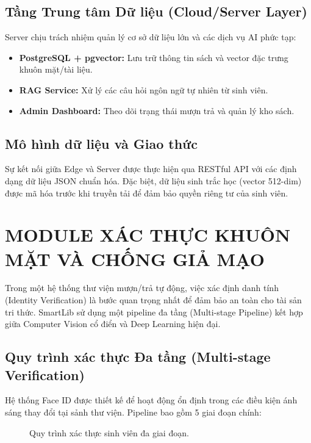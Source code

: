 \documentclass[12pt,a4paper]{article}
\begin{document}
\subsection{Tầng Trung tâm Dữ liệu (Cloud/Server Layer)}
Server chịu trách nhiệm quản lý cơ sở dữ liệu lớn và các dịch vụ AI phức tạp:
\begin{itemize}
    \item \textbf{PostgreSQL + pgvector:} Lưu trữ thông tin sách và vector đặc trưng khuôn mặt/tài liệu.
    \item \textbf{RAG Service:} Xử lý các câu hỏi ngôn ngữ tự nhiên từ sinh viên.
    \item \textbf{Admin Dashboard:} Theo dõi trạng thái mượn trả và quản lý kho sách.
\end{itemize}

\subsection{Mô hình dữ liệu và Giao thức}
Sự kết nối giữa Edge và Server được thực hiện qua RESTful API với các định dạng dữ liệu JSON chuẩn hóa. Đặc biệt, dữ liệu sinh trắc học (vector 512-dim) được mã hóa trước khi truyền tải để đảm bảo quyền riêng tư của sinh viên.

\section{MODULE XÁC THỰC KHUÔN MẶT VÀ CHỐNG GIẢ MẠO}

Trong một hệ thống thư viện mượn/trả tự động, việc xác định danh tính (Identity Verification) là bước quan trọng nhất để đảm bảo an toàn cho tài sản tri thức. SmartLib sử dụng một pipeline đa tầng (Multi-stage Pipeline) kết hợp giữa Computer Vision cổ điển và Deep Learning hiện đại.

\subsection{Quy trình xác thực Đa tầng (Multi-stage Verification)}

Hệ thống Face ID được thiết kế để hoạt động ổn định trong các điều kiện ánh sáng thay đổi tại sảnh thư viện. Pipeline bao gồm 5 giai đoạn chính:

\begin{figure}[H]
    \centering
    \caption{Quy trình xác thực sinh viên đa giai đoạn.}
    \label{fig:face_id_pipeline}
\end{figure}
\end{document}
